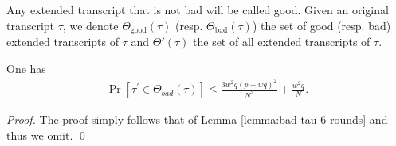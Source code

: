 \begin{definition}
\begin{itemize}[leftmargin=10mm]
	\end{itemize}
	Any extended transcript that is not bad will be called good. Given an original transcript $\tau$, we denote $\Theta_{\mathrm{good}}(\tau)$ (resp. $\Theta_{\mathrm{bad}}(\tau)$) the set of good (resp. bad) extended transcripts of $\tau$ and $\Theta'(\tau)$ the set of all extended transcripts of $\tau$.
\end{definition}



%
%
%	


\begin{lemma}
	\label{lemma:bad-tau-6-rounds}
	
	One has
	\begin{align}
	\operatorname{Pr}[\tau^{\prime} \in \Theta_{bad}(\tau)] \leq \frac{3w^{2} q \left(p+w q\right)^{2}}{N^{2}} + \frac{w^{2} q}{N}.
	\label{eq:bound-bad-tau-6-rounds}
	\end{align}
\end{lemma}
\begin{proof}
The proof simply follows that of Lemma \ref{lemma:bad-tau-6-rounds} and thus we omit.            \qed
\end{proof}



